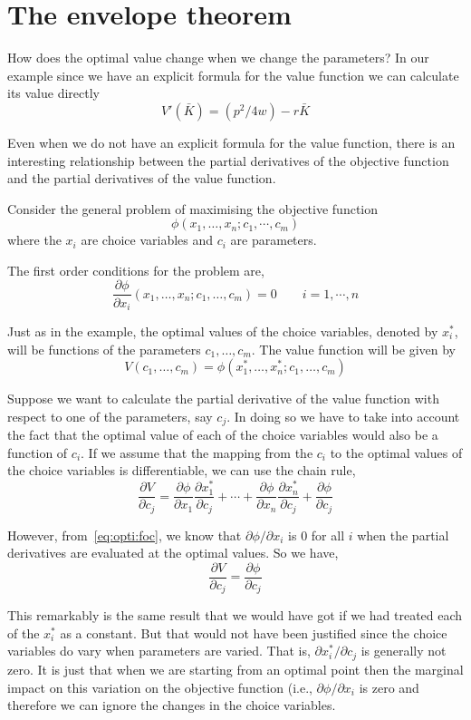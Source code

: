 \documentclass[11pt,reqno,openany]{amsbook}
\begin{document}
\section{The envelope theorem}
How does the optimal value change when we change the parameters? In
our example since we have an explicit formula for the value function
we can calculate its value directly
\[V'(\bar K) =(p^2/4w)-r\bar K\]

Even when we do not have an explicit formula for the value function,
there is an interesting relationship between the partial derivatives
of the objective function and the partial derivatives of the value
function.

Consider the general problem of maximising the objective function
\[\phi(x_1,\ldots,x_n;c_1,\cdots,c_m)\]
where the $x_i$ are choice variables and $c_i$ are parameters.

The first order conditions for the problem are,
\begin{equation}\label{eq:opti:foc}
\frac{\partial \phi}{\partial
  x_i}(x_1,\ldots,x_n;c_1,\ldots,c_m)=0\qquad i=1,\cdots,n
\end{equation}

Just as in the example, the optimal values of the choice variables,
denoted by $x_i^*$, will be functions of the parameters
$c_1,\ldots,c_m$. The value function will be given by
\[V(c_1,\ldots,c_m)=\phi(x_1^*,\ldots,x_n^*;c_1,\ldots,c_m)\]

Suppose we want to calculate the partial derivative of the value
function with respect to one of the parameters, say $c_j$. In doing so
we have to take into account the fact that the optimal value of each
of the choice variables would also be a function of $c_i$.
If we assume that the mapping from the $c_i$ to the optimal
values of the choice variables is differentiable, we can use the
chain rule,
\[\frac{\partial V}{\partial c_j}=
\frac{\partial \phi}{\partial x_1}\frac{\partial x_1^*}{\partial c_j}
+\cdots
+\frac{\partial \phi}{\partial x_n}\frac{\partial x_n^*}{\partial c_j}
+\frac{\partial \phi}{\partial c_j}
\]

However, from~\eqref{eq:opti:foc}, we know that $\partial
\phi/\partial x_i$ is $0$ for all $i$ when the partial derivatives are
evaluated at the optimal values. So we have,
\begin{equation}\label{eq:opti:envelope}
\frac{\partial V}{\partial c_j}=\frac{\partial \phi}{\partial c_j}
\end{equation}

This remarkably is the same result that we would have got if we had
treated each of the $x_i^*$ as a constant. But that would not have
been justified since the choice variables do vary when parameters are
varied. That is, $\partial x_i^*/\partial c_j$ is generally not zero.
It is just that when we are starting from an optimal point then the
marginal impact on this variation on the objective function (i.e.,
$\partial \phi/\partial x_i$ is zero and therefore we can ignore the
changes in the choice variables.
\end{document}
